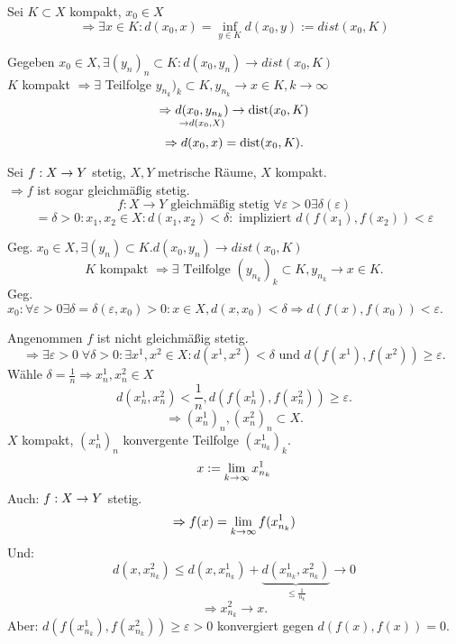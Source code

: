 \documentclass[../ana2.tex]{subfiles}
\begin{document}
\begin{bem}
    Sei \(K \subset X\) kompakt, \(x_0 \in X\)
    \[ \Rightarrow \exists x \in K: d(x_0, x) 
    = \underset{y \in K}{\inf} d(x_0, y) 
    := dist(x_0, K) \]
\end{bem}
\begin{bew}
    Gegeben \( x_0 \in X, \exists (y_n)_n \subset K: 
    d(x_0, y_n) \rightarrow dist(x_0, K) \) \\
    \(K\) kompakt \( \Rightarrow \exists \) Teilfolge 
    \(y_{n_k})_k \subset K, y_{n_k} \rightarrow x \in K, 
    k \rightarrow \infty\)    
    \[ \Rightarrow \underset{\rightarrow d(x_0, X)}{d(x_0, y_{n_k})} 
    \rightarrow \operatorname{dist}(x_0, K) \]
    \[ \Rightarrow d(x_0, x) = \operatorname{dist}(x_0, K). \]
\end{bew}
\begin{satz}
    Sei \( f:X\rightarrow Y \) stetig, 
    \( X, Y \) metrische Räume, \(X\)
    kompakt. \\
    \( \Rightarrow f \) ist sogar gleichmäßig 
    stetig.
    \[ f: X \rightarrow Y \text{ gleichmäßig stetig }
    \forall \varepsilon > 0 \exists 
    \delta(\varepsilon) \]
    \[ = \delta > 0:
    x_1, x_2 \in X: d(x_1, x_2) < \delta:
    \text{ impliziert } d(f(x_1), f(x_2)) < \varepsilon \]
\end{satz}
\begin{bew}
    Geg. \( x_0 \in X, \exists (y_n) \subset K. d(x_0, y_n) 
    \rightarrow dist(x_0, K) \)
    \[ K \text{ kompakt } \Rightarrow \exists \text{ Teilfolge } 
    (y_{n_k})_k \subset K, y_{n_k} \rightarrow x \in K. \]
    Geg. \( x_0: \forall \varepsilon > 0 \exists \delta 
    = \delta(\varepsilon, x_0) > 0:
    x \in X, d(x, x_0) < \delta \Rightarrow d(f(x), f(x_0)) 
    < \varepsilon. \)

    Angenommen \( f \) ist nicht gleichmäßig stetig.
    \[ \Rightarrow \exists \varepsilon > 0 
    \;\forall \delta > 0: \exists x^1, x^2 \in X: 
    d(x^1, x^2) < \delta 
    \text{ und } d(f(x^1), f(x^2)) \geq \varepsilon. \]
    Wähle \( \delta = \frac{1}{n} \Rightarrow x_n^1, x_n^2
    \in X \)
    \[ d(x_n^1, x_n^2) < \frac{1}{n}, d(f(x_n^1), f(x_n^2)) 
    \geq \varepsilon. \]
    \[ \Rightarrow (x_n^1)_n, (x_n^2)_n \subset X. \]
    \( X \) kompakt, \( (x_n^1)_n \) konvergente Teilfolge 
    \( (x_{n_k}^1)_k \).
    \[ x := \lim\limits_{k\rightarrow\infty} x_{n_k}^1 \]
    Auch: \( f:X\rightarrow Y \) stetig.
    \[ \Rightarrow f(x) = \lim\limits_{k\rightarrow\infty} f(x_{n_k}^1) \]
    Und: \[ d(x, x_{n_k}^2) \leq d(x, x_{n_k}^1) 
    + \underbrace{d(x_{n_k}^1, x_{n_k}^2)}_{\leq \frac{1}{n_k}} 
    \rightarrow 0 \]
    \[ \Rightarrow x_{n_k}^2 \rightarrow x. \]
    Aber: \( d(f(x_{n_k}^1), f(x_{n_k}^2)) \geq \varepsilon > 0 \)
    konvergiert gegen \( d(f(x), f(x)) = 0 \). \Lightning{}
\end{bew}
\end{document}
